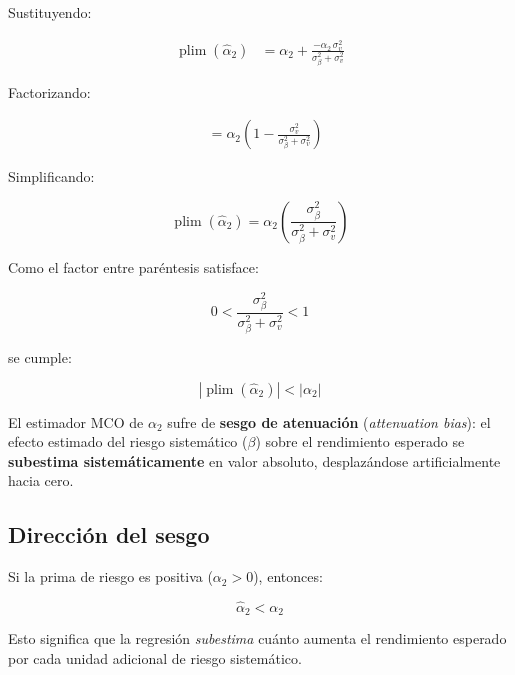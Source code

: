 \documentclass[12pt,letterpaper]{article}
\newcommand{\plim}{\operatorname{plim}}
\begin{document}
Sustituyendo:

\begin{align}
\plim(\hat{\alpha}_{2})
&= \alpha_{2}
   + \frac{-\alpha_{2}\,\sigma_{v}^{2}}{\sigma_{\beta}^{2} + \sigma_{v}^{2}}
\end{align}

Factorizando:

\begin{align}
&= \alpha_{2}
   \left(
     1 - \frac{\sigma_{v}^{2}}{\sigma_{\beta}^{2} + \sigma_{v}^{2}}
   \right)
\end{align}

Simplificando:

\begin{equation}
\boxed{
\plim(\hat{\alpha}_{2})
= \alpha_{2}
  \left(
    \frac{\sigma_{\beta}^{2}}{\sigma_{\beta}^{2} + \sigma_{v}^{2}}
  \right)
}
\end{equation}

Como el factor entre paréntesis satisface:

\begin{equation}
0
<
\frac{\sigma_{\beta}^{2}}{\sigma_{\beta}^{2} + \sigma_{v}^{2}}
< 1
\end{equation}

se cumple:

\begin{equation}
\left|\plim(\hat{\alpha}_{2})\right| < |\alpha_{2}|
\end{equation}

\begin{clave}

El estimador MCO de $\alpha_{2}$ sufre de \textbf{sesgo de atenuación}
(\textit{attenuation bias}): el efecto estimado del riesgo sistemático
($\beta$) sobre el rendimiento esperado se \textbf{subestima
sistemáticamente} en valor absoluto, desplazándose artificialmente
hacia cero.

\end{clave}

\subsection{Dirección del sesgo}

Si la prima de riesgo es positiva ($\alpha_{2} > 0$), entonces:

\begin{equation}
\hat{\alpha}_{2} < \alpha_{2}
\end{equation}

Esto significa que la regresión \emph{subestima} cuánto aumenta el
rendimiento esperado por cada unidad adicional de riesgo sistemático.
\end{document}
